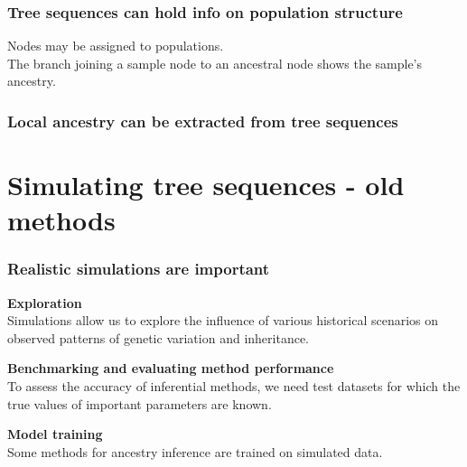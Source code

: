 \documentclass[11pt, mathserif, aspectratio=169]{beamer}
\newenvironment{wideitemize}{\itemize\addtolength{\itemsep}{10pt}}{\enditemize}
\begin{document}
\begin{frame}
\frametitle{Tree sequences can hold info on population structure}
\begin{minipage}{.38\textwidth}
\begin{center}

\end{center}
\end{minipage}\hfill
\begin{minipage}{.58\textwidth}
Nodes may be assigned to populations.\\

The branch joining a sample node to an ancestral node shows the sample's ancestry.

\end{minipage}
\end{frame}

\begin{frame}
\frametitle{Local ancestry can be extracted from tree sequences}
\begin{center}

\end{center}
\end{frame}


\section{Simulating tree sequences - old methods}

\begin{frame}
\frametitle{Realistic simulations are important}
\begin{wideitemize}
\item {\bf Exploration\\}
Simulations allow us to explore the influence of various historical scenarios on observed patterns of genetic variation and inheritance.
\item {\bf Benchmarking and evaluating method performance\\}
To assess the accuracy of inferential methods, we need test datasets for which the true values of important parameters are known.
\item {\bf Model training\\}
Some methods for ancestry inference are trained on simulated data.
\end{wideitemize}
\end{frame}
\end{document}

